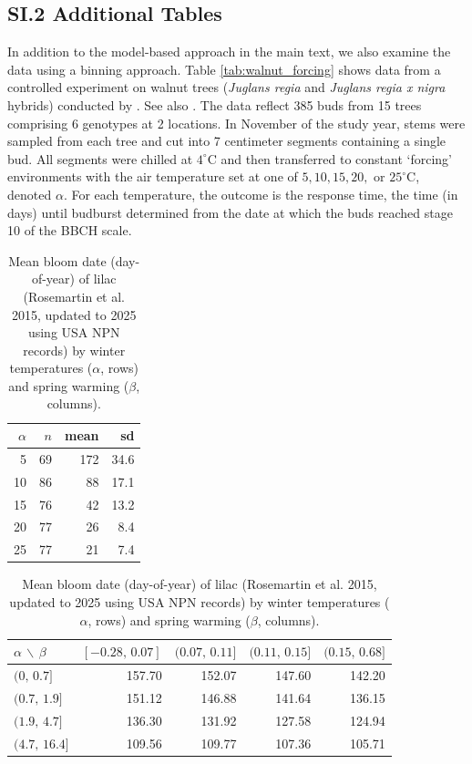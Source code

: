 \documentclass[
]{article}
\begin{document}
{\subsection{SI.2 Additional Tables}\label{s.2-additional-tables}

In addition to the model-based approach in the main text, we also examine the data using a binning approach.  
Table \ref{tab:walnut_forcing} shows data from a controlled experiment on walnut trees
(\textit{Juglans regia} and \textit{Juglans regia x nigra} hybrids) conducted by \cite{Charrier:2011aa}. 
See also \cite{guillaume2018assessing}. The data reflect 385 buds from 15 trees comprising 6 genotypes at 2
locations. In November of the study year, stems were sampled from each
tree and cut into 7 centimeter segments containing a single bud. All
segments were chilled at \(4^\circ\)C and then transferred to constant
`forcing' environments with the air temperature set at one of \(5,10,15,20,\)
or \(25^\circ\)C, denoted \(\alpha\). For each temperature, the outcome is the response
time, the time (in days) until budburst determined from the date at
which the buds reached stage 10 of the BBCH scale.


\begin{table}[t]
\centering
\caption{Summary data from the Walnut forcing experiment (Charrier et al. 2011).}
\label{tab:walnut_forcing}
\begin{tabular}{rrrr}
\toprule
$\alpha$ & $n$ & mean & sd \\
\midrule
 5  & 69 & 172 & 34.6  \\
10  & 86 &  88 & 17.1  \\
15  & 76 &  42 & 13.2  \\
20  & 77 &  26 &  8.4  \\
25  & 77 &  21 &  7.4  \\
\bottomrule
\end{tabular}

\vspace{2em}

\centering
\caption{Mean bloom date (day-of-year) of lilac (Rosemartin et al. 2015, updated to 2025 using USA NPN records) by winter temperatures ($\alpha$, rows) and spring warming ($\beta$, columns).}
\label{tab:mean_bloom_bins}
\begin{tabular}{lrrrr}
\toprule
$\alpha$ $\backslash$ $\beta$
& $[-0.28,\,0.07]$ & $(0.07,\,0.11]$ & $(0.11,\,0.15]$ & $(0.15,\,0.68]$ \\
\midrule
$(0,\,0.7]$     & 157.70 & 152.07 & 147.60 & 142.20 \\
$(0.7,\,1.9]$   & 151.12 & 146.88 & 141.64 & 136.15 \\
$(1.9,\,4.7]$     & 136.30 & 131.92 & 127.58 & 124.94 \\
$(4.7,\,16.4]$    & 109.56 & 109.77 & 107.36 & 105.71 \\
\bottomrule
\end{tabular}


\end{table}}
\end{document}
